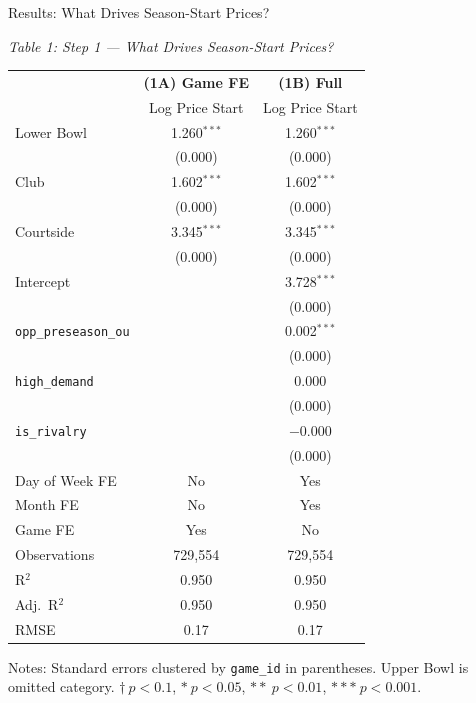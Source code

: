 \documentclass{beamer}
\begin{document}
\begin{frame}{Results: What Drives Season-Start Prices?}

\vspace{-0.5em}
\begin{center}
\tiny
\textit{Table 1: Step 1 --- What Drives Season-Start Prices?}

\vspace{0.2em}
\begin{tabular}{lcc}
\toprule
 & \textbf{(1A) Game FE} & \textbf{(1B) Full} \\
 & Log Price Start & Log Price Start \\
\midrule
Lower Bowl       & 1.260$^{***}$ & 1.260$^{***}$ \\
                 & (0.000)       & (0.000)       \\
Club             & 1.602$^{***}$ & 1.602$^{***}$ \\
                 & (0.000)       & (0.000)       \\
Courtside        & 3.345$^{***}$ & 3.345$^{***}$ \\
                 & (0.000)       & (0.000)       \\
Intercept        &               & 3.728$^{***}$ \\
                 &               & (0.000)       \\
\texttt{opp\_preseason\_ou} &   & 0.002$^{***}$ \\
                 &               & (0.000)       \\
\texttt{high\_demand}       &   & 0.000         \\
                 &               & (0.000)       \\
\texttt{is\_rivalry}        &   & $-$0.000      \\
                 &               & (0.000)       \\
\midrule
Day of Week FE   & No  & Yes \\
Month FE         & No  & Yes \\
Game FE          & Yes & No  \\
\midrule
Observations     & 729,554 & 729,554 \\
R$^2$            & 0.950   & 0.950   \\
Adj.\ R$^2$      & 0.950   & 0.950   \\
RMSE             & 0.17    & 0.17    \\
\bottomrule
\end{tabular}

\vspace{0.2em}
\parbox{0.85\textwidth}{\tiny
Notes: Standard errors clustered by \texttt{game\_id} in parentheses. Upper Bowl is omitted category. $\dagger\ p < 0.1$, $*\ p < 0.05$, $**\ p < 0.01$, $***\ p < 0.001$.}
\end{center}

\end{frame}
\end{document}
